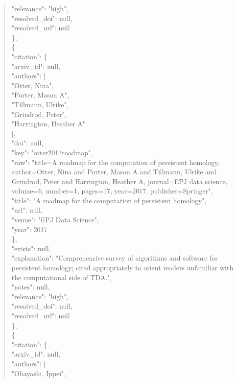 \documentclass[11pt]{article}
\begin{document}
\begin{quote}
      "relevance": "high",\\
      "resolved\_doi": null,\\
      "resolved\_url": null\\
    \},\\
    \{\\
      "citation": \{\\
        "arxiv\_id": null,\\
        "authors": [\\
          "Otter, Nina",\\
          "Porter, Mason A",\\
          "Tillmann, Ulrike",\\
          "Grindrod, Peter",\\
          "Harrington, Heather A"\\
        ],\\
        "doi": null,\\
        "key": "otter2017roadmap",\\
        "raw": "title=A roadmap for the computation of persistent homology, author=Otter, Nina and Porter, Mason A and Tillmann, Ulrike and Grindrod, Peter and Harrington, Heather A, journal=EPJ data science, volume=6, number=1, pages=17, year=2017, publisher=Springer",\\
        "title": "A roadmap for the computation of persistent homology",\\
        "url": null,\\
        "venue": "EPJ Data Science",\\
        "year": 2017\\
      \},\\
      "exists": null,\\
      "explanation": "Comprehensive survey of algorithms and software for persistent homology; cited appropriately to orient readers unfamiliar with the computational side of TDA.",\\
      "notes": null,\\
      "relevance": "high",\\
      "resolved\_doi": null,\\
      "resolved\_url": null\\
    \},\\
    \{\\
      "citation": \{\\
        "arxiv\_id": null,\\
        "authors": [\\
          "Obayashi, Ippei",\\

\end{quote}
\end{document}
